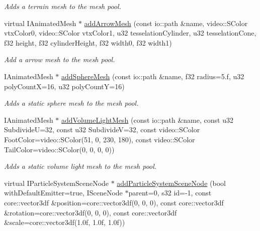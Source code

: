 \begin{DoxyCompactItemize}
\begin{DoxyCompactList}\small\item\em Adds a terrain mesh to the mesh pool. \end{DoxyCompactList}\item 
virtual I\-Animated\-Mesh $\ast$ \hyperlink{classirr_1_1scene_1_1_c_scene_manager_a80c62ca2c69728f79c0d3f80110f7a67}{add\-Arrow\-Mesh} (const io\-::path \&name, video\-::\-S\-Color vtx\-Color0, video\-::\-S\-Color vtx\-Color1, u32 tesselation\-Cylinder, u32 tesselation\-Cone, f32 height, f32 cylinder\-Height, f32 width0, f32 width1)
\begin{DoxyCompactList}\small\item\em Add a arrow mesh to the mesh pool. \end{DoxyCompactList}\item 
\hypertarget{classirr_1_1scene_1_1_c_scene_manager_aa91ac3065d6884cc94047df93841367a}{I\-Animated\-Mesh $\ast$ \hyperlink{classirr_1_1scene_1_1_c_scene_manager_aa91ac3065d6884cc94047df93841367a}{add\-Sphere\-Mesh} (const io\-::path \&name, f32 radius=5.f, u32 poly\-Count\-X=16, u32 poly\-Count\-Y=16)}\label{classirr_1_1scene_1_1_c_scene_manager_aa91ac3065d6884cc94047df93841367a}

\begin{DoxyCompactList}\small\item\em Adds a static sphere mesh to the mesh pool. \end{DoxyCompactList}\item 
\hypertarget{classirr_1_1scene_1_1_c_scene_manager_af1d9482aea5ec04df3a68d8a2d3d9c67}{I\-Animated\-Mesh $\ast$ \hyperlink{classirr_1_1scene_1_1_c_scene_manager_af1d9482aea5ec04df3a68d8a2d3d9c67}{add\-Volume\-Light\-Mesh} (const io\-::path \&name, const u32 Subdivide\-U=32, const u32 Subdivide\-V=32, const video\-::\-S\-Color Foot\-Color=video\-::\-S\-Color(51, 0, 230, 180), const video\-::\-S\-Color Tail\-Color=video\-::\-S\-Color(0, 0, 0, 0))}\label{classirr_1_1scene_1_1_c_scene_manager_af1d9482aea5ec04df3a68d8a2d3d9c67}

\begin{DoxyCompactList}\small\item\em Adds a static volume light mesh to the mesh pool. \end{DoxyCompactList}\item 
\hypertarget{classirr_1_1scene_1_1_c_scene_manager_a7c08fafeabd4fa0b178ddce25e2f8ba7}{virtual I\-Particle\-System\-Scene\-Node $\ast$ \hyperlink{classirr_1_1scene_1_1_c_scene_manager_a7c08fafeabd4fa0b178ddce25e2f8ba7}{add\-Particle\-System\-Scene\-Node} (bool with\-Default\-Emitter=true, I\-Scene\-Node $\ast$parent=0, s32 id=-\/1, const core\-::vector3df \&position=core\-::vector3df(0, 0, 0), const core\-::vector3df \&rotation=core\-::vector3df(0, 0, 0), const core\-::vector3df \&scale=core\-::vector3df(1.\-0f, 1.\-0f, 1.\-0f))}\label{classirr_1_1scene_1_1_c_scene_manager_a7c08fafeabd4fa0b178ddce25e2f8ba7}


\end{DoxyCompactItemize}
